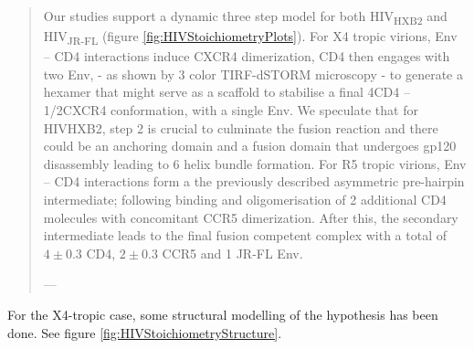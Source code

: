 \documentclass[12pt,]{book}
\theoremstyle{definition}
\theoremstyle{definition}
\theoremstyle{definition}
\theoremstyle{remark}
\begin{document}
\begin{quote}
Our studies support a dynamic three step model for both
HIV\textsubscript{HXB2} and HIV\textsubscript{JR-FL} (figure
\ref{fig:HIVStoichiometryPlots}). For X4 tropic virions, Env -- CD4
interactions induce CXCR4 dimerization, CD4 then engages with two Env, -
as shown by 3 color TIRF-dSTORM microscopy - to generate a hexamer that
might serve as a scaffold to stabilise a final 4CD4 -- 1/2CXCR4
conformation, with a single Env. We speculate that for HIVHXB2, step 2
is crucial to culminate the fusion reaction and there could be an
anchoring domain and a fusion domain that undergoes gp120 disassembly
leading to 6 helix bundle formation. For R5 tropic virions, Env -- CD4
interactions form a the previously described asymmetric pre-hairpin
intermediate; following binding and oligomerisation of 2 additional CD4
molecules with concomitant CCR5 dimerization. After this, the secondary
intermediate leads to the final fusion competent complex with a total of
\(4\pm0.3\) CD4, \(2 \pm 0.3\) CCR5 and 1 JR-FL Env.

--- \citet{HIVstoichiometry}
\end{quote}

For the X4-tropic case, some structural modelling of the hypothesis has
been done. See figure \ref{fig:HIVStoichiometryStructure}.
\end{document}
